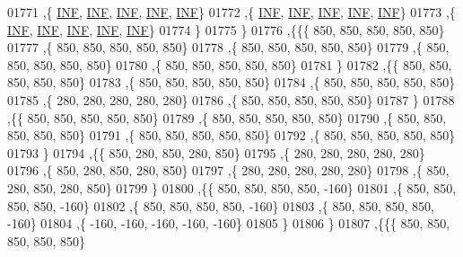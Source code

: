 \begin{DoxyCode}
01771    ,\{   \mbox{\hyperlink{1_88_84__epars_8h_a12c2040f25d8e3a7b9e1c2024c618cb6}{INF}},   \mbox{\hyperlink{1_88_84__epars_8h_a12c2040f25d8e3a7b9e1c2024c618cb6}{INF}},   \mbox{\hyperlink{1_88_84__epars_8h_a12c2040f25d8e3a7b9e1c2024c618cb6}{INF}},   \mbox{\hyperlink{1_88_84__epars_8h_a12c2040f25d8e3a7b9e1c2024c618cb6}{INF}},   \mbox{\hyperlink{1_88_84__epars_8h_a12c2040f25d8e3a7b9e1c2024c618cb6}{INF}}\}
01772    ,\{   \mbox{\hyperlink{1_88_84__epars_8h_a12c2040f25d8e3a7b9e1c2024c618cb6}{INF}},   \mbox{\hyperlink{1_88_84__epars_8h_a12c2040f25d8e3a7b9e1c2024c618cb6}{INF}},   \mbox{\hyperlink{1_88_84__epars_8h_a12c2040f25d8e3a7b9e1c2024c618cb6}{INF}},   \mbox{\hyperlink{1_88_84__epars_8h_a12c2040f25d8e3a7b9e1c2024c618cb6}{INF}},   \mbox{\hyperlink{1_88_84__epars_8h_a12c2040f25d8e3a7b9e1c2024c618cb6}{INF}}\}
01773    ,\{   \mbox{\hyperlink{1_88_84__epars_8h_a12c2040f25d8e3a7b9e1c2024c618cb6}{INF}},   \mbox{\hyperlink{1_88_84__epars_8h_a12c2040f25d8e3a7b9e1c2024c618cb6}{INF}},   \mbox{\hyperlink{1_88_84__epars_8h_a12c2040f25d8e3a7b9e1c2024c618cb6}{INF}},   \mbox{\hyperlink{1_88_84__epars_8h_a12c2040f25d8e3a7b9e1c2024c618cb6}{INF}},   \mbox{\hyperlink{1_88_84__epars_8h_a12c2040f25d8e3a7b9e1c2024c618cb6}{INF}}\}
01774    \}
01775   \}
01776  ,\{\{\{   850,   850,   850,   850,   850\}
01777    ,\{   850,   850,   850,   850,   850\}
01778    ,\{   850,   850,   850,   850,   850\}
01779    ,\{   850,   850,   850,   850,   850\}
01780    ,\{   850,   850,   850,   850,   850\}
01781    \}
01782   ,\{\{   850,   850,   850,   850,   850\}
01783    ,\{   850,   850,   850,   850,   850\}
01784    ,\{   850,   850,   850,   850,   850\}
01785    ,\{   280,   280,   280,   280,   280\}
01786    ,\{   850,   850,   850,   850,   850\}
01787    \}
01788   ,\{\{   850,   850,   850,   850,   850\}
01789    ,\{   850,   850,   850,   850,   850\}
01790    ,\{   850,   850,   850,   850,   850\}
01791    ,\{   850,   850,   850,   850,   850\}
01792    ,\{   850,   850,   850,   850,   850\}
01793    \}
01794   ,\{\{   850,   280,   850,   280,   850\}
01795    ,\{   280,   280,   280,   280,   280\}
01796    ,\{   850,   280,   850,   280,   850\}
01797    ,\{   280,   280,   280,   280,   280\}
01798    ,\{   850,   280,   850,   280,   850\}
01799    \}
01800   ,\{\{   850,   850,   850,   850,  -160\}
01801    ,\{   850,   850,   850,   850,  -160\}
01802    ,\{   850,   850,   850,   850,  -160\}
01803    ,\{   850,   850,   850,   850,  -160\}
01804    ,\{  -160,  -160,  -160,  -160,  -160\}
01805    \}
01806   \}
01807  ,\{\{\{   850,   850,   850,   850,   850\}

\end{DoxyCode}
